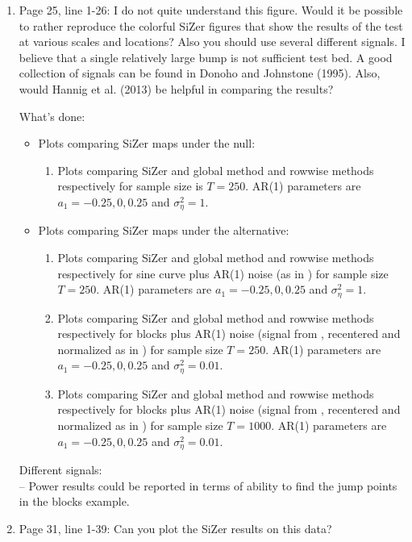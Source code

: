 \documentclass[a4paper,12pt]{article}
\begin{document}
\begin{enumerate}
\item Page 25, line 1-26: I do not quite understand this figure. Would it be possible to rather reproduce the colorful SiZer figures that show the results of the test at various scales and locations? Also you should use several different signals. I believe that a single relatively large bump is not sufficient test bed. A good collection of signals can be found in Donoho and Johnstone (1995). Also, would Hannig et al. (2013) be helpful in comparing the results?

What's done:
\begin{itemize}
\item Plots comparing SiZer maps under the null:
\begin{enumerate}
\item Plots comparing SiZer and global method and rowwise methods respectively for sample size is $T=250$. AR(1) parameters are $a_1 = -0.25, 0, 0.25$ and $\sigma_\eta^2 = 1$.
\end{enumerate}
\item Plots comparing SiZer maps under the alternative:
\begin{enumerate}
\item Plots comparing SiZer and global method and rowwise methods respectively for sine curve plus AR(1) noise (as in \cite*{ParkHannigKang2009}) for sample size $T=250$. AR(1) parameters are $a_1 = -0.25, 0, 0.25$ and $\sigma_\eta^2 = 1$.
\item Plots comparing SiZer and global method and rowwise methods respectively for blocks plus AR(1) noise (signal from \cite*{Donoho1995}, recentered and normalized as in \cite*{HannigMarron2006}) for sample size $T=250$. AR(1) parameters are $a_1 = -0.25, 0, 0.25$ and $\sigma_\eta^2 = 0.01$.
\item Plots comparing SiZer and global method and rowwise methods respectively for blocks plus AR(1) noise (signal from \cite*{Donoho1995}, recentered and normalized as in \cite*{HannigMarron2006}) for sample size $T=1000$. AR(1) parameters are $a_1 = -0.25, 0, 0.25$ and $\sigma_\eta^2 = 0.01$.
\end{enumerate}
\end{itemize}

Different signals: \\
-- Power results could be reported in terms of ability to find the jump points in the blocks example. 

\item Page 31, line 1-39: Can you plot the SiZer results on this data?
\end{enumerate}

{\small
\setlength{\bibsep}{0.55em}
}
\end{document}
